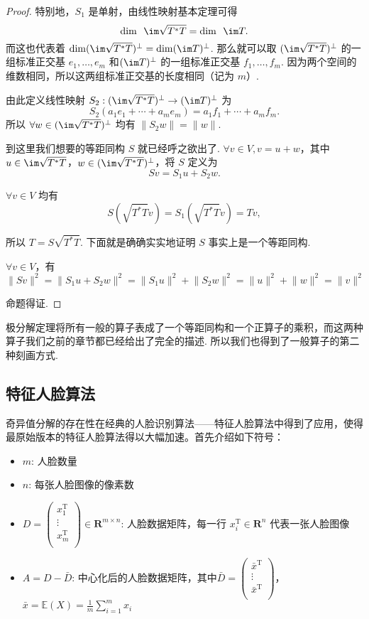 \begin{proof}
    特别地，$ S_1 $ 是单射，由线性映射基本定理可得
    \[ \dim \enspace \im \sqrt{T^*T} = \dim \enspace \im T. \]
    而这也代表着 $ \dim(\im \sqrt{T^*T})^{\perp} = \dim(\im T)^{\perp} $. 那么就可以取 $ (\im \sqrt{T^*T})^{\perp} $ 的一组标准正交基 $ e_1, \ldots , e_m $ 和$ (\im T)^{\perp} $ 的一组标准正交基 $ f_1, \ldots, f_m $. 因为两个空间的维数相同，所以这两组标准正交基的长度相同（记为 $ m $）.

    由此定义线性映射 $ S_2: (\im \sqrt{T^*T})^{\perp} \rightarrow (\im T)^{\perp} $ 为
    \[ S_2(a_1e_1 + \cdots + a_me_m) = a_1f_1 + \cdots + a_mf_m. \]
    所以 $ \forall w \in (\im \sqrt{T^*T})^{\perp} $ 均有 $ \lVert S_2w \rVert = \lVert w \rVert $.

    到这里我们想要的等距同构 $ S $ 就已经呼之欲出了. $ \forall v \in V, v = u + w $，其中 $ u \in \im \sqrt{T^*T} $，$ w \in (\im \sqrt{T^*T})^{\perp} $，将 $ S $ 定义为
    \[ Sv = S_1u + S_2w. \]

    $ \forall v \in V $ 均有
    \[ S(\sqrt{T^*T}v) = S_1(\sqrt{T^*T}v) = Tv, \]

    所以 $ T = S\sqrt{T^*T} $. 下面就是确确实实地证明 $ S $ 事实上是一个等距同构.

    $ \forall v \in V $，有
    \[ \lVert Sv \rVert^2 = \lVert S_1u + S_2w \rVert^2     = \lVert S_1u \rVert^2 + \lVert S_2w \rVert^2 = \lVert u \rVert^2 + \lVert w \rVert^2 = \lVert v \rVert^2 \]

    命题得证.
\end{proof}

极分解定理将所有一般的算子表成了一个等距同构和一个正算子的乘积，而这两种算子我们之前的章节都已经给出了完全的描述. 所以我们也得到了一般算子的第二种刻画方式.

\subsection{特征人脸算法}

奇异值分解的存在性在经典的人脸识别算法——特征人脸算法中得到了应用，使得最原始版本的特征人脸算法得以大幅加速。首先介绍如下符号：

\begin{itemize}
    \item $m$: 人脸数量
    \item $n$: 每张人脸图像的像素数
    \item $D = \begin{pmatrix}
        x_1^\mathrm{T} \\
        \vdots \\
        x_m^\mathrm{T} \\
    \end{pmatrix}\in \mathbf{R}^{m\times n}$: 人脸数据矩阵，每一行 $x_i^\mathrm{T} \in \mathbf{R}^n$ 代表一张人脸图像
    \item $A=D - \bar{D}$: 中心化后的人脸数据矩阵，其中$\bar{D} = \begin{pmatrix}
        \bar{x}^\mathrm{T} \\
        \vdots \\
        \bar{x}^\mathrm{T} \\
    \end{pmatrix}$，$\bar{x} = \mathbb{E}(X) = \frac{1}{m}\sum_{i=1}^m x_i$
\end{itemize}

